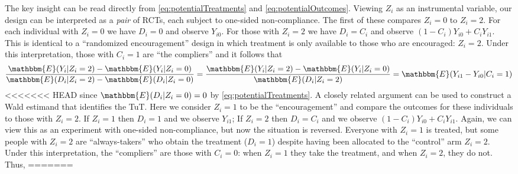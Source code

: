 \documentclass[oneside,11pt]{article}
\begin{document}
{The key insight can be read directly from \eqref{eq:potentialTreatments} and \eqref{eq:potentialOutcomes}. 
Viewing $Z_i$ as an instrumental variable, our design can be interpreted as a \emph{pair} of RCTs, each subject to one-sided non-compliance.
The first of these compares $Z_i=0$ to $Z_i = 2$. For each individual with $Z_i = 0$ we have $D_i = 0$ and observe $Y_{i0}$. For those with $Z_i = 2$ we have $D_i = C_i$ and observe $(1 - C_i) Y_{i0} + C_i Y_{i1}$. This is identical to a ``randomized encouragement'' design in which treatment is only available to those who are encouraged: $Z_i = 2$. Under this interpretation, those with $C_i = 1$ are ``the compliers'' and it follows that 
\begin{equation}
\frac{\mathbbm{E}(Y_i|Z_i=2) - \mathbbm{E}(Y_i|Z_i =0)}{\mathbbm{E}(D_i|Z_i=2)-\mathbbm{E}(D_i|Z_i=0)} = 
\frac{\mathbbm{E}(Y_i|Z_i=2) - \mathbbm{E}(Y_i|Z_i =0)}{\mathbbm{E}(D_i|Z_i=2)} = \mathbbm{E}(Y_{i1} - Y_{i0}|C_i = 1)
\label{eq:ToT}
\end{equation}
<<<<<<< HEAD
since $\mathbbm{E}(D_i|Z_i=0)=0$ by \eqref{eq:potentialTreatments}. 
A closely related argument can be used to construct a Wald estimand that identifies the TuT. Here we consider $Z_i = 1$ to be the ``encouragement'' and compare the outcomes for these individuals to those with $Z_i = 2$. If $Z_i = 1$ then $D_i = 1$ and we observe $Y_{i1}$; If $Z_i = 2$ then $D_i = C_i$ and we observe $(1 - C_i) Y_{i0} + C_i Y_{i1}$. Again, we can view this as an experiment with one-sided non-compliance, but now the situation is reversed. Everyone with $Z_i = 1$ is treated, but some people with $Z_i = 2$ are ``always-takers'' who obtain the treatment ($D_i = 1$) despite having been allocated to the ``control'' arm $Z_i=2$. Under this interpretation, the ``compliers'' are those with $C_i = 0$: when $Z_i=1$ they take the treatment, and when $Z_i=2$, they do not. Thus, 
=======

}
\end{document}
